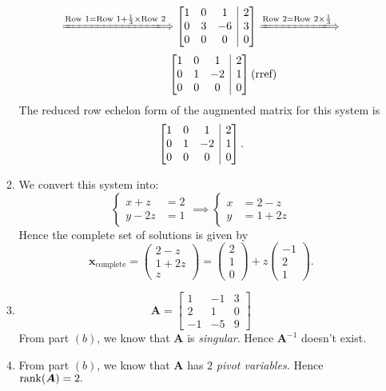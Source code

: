 \begin{enumerate}
\begin{enumerate}
\[\xLongrightarrow{\text{Row 1}=\text{Row 1}+\frac{1}{3}\x\text{Row 2}}
\left[\begin{array}{@{}ccc|c@{}}
1&0&1&2\\
0&3&-6&3\\
0&0&0&0
\end{array}\right]
\xLongrightarrow{\text{Row 2}=\text{Row 2}\x\frac{1}{3}}
\]
\[
\qquad\qquad\left[\begin{array}{@{}ccc|c@{}}
1&0&1&2\\
0&1&-2&1\\
0&0&0&0
\end{array}\right](\text{rref})
\]
The reduced row echelon form of the augmented matrix for this system is
\[
\left[\begin{array}{@{}ccc|c@{}}
1&0&1&2\\
0&1&-2&1\\
0&0&0&0
\end{array}\right].
\]
\item
We convert this system into:
\[
\left\{
\begin{aligned}
x+z&=2\\
y-2z&=1
\end{aligned}
\right.
\implies
\left\{
\begin{aligned}
x&=2-z\\
y&=1+2z
\end{aligned}
\right.
\]
Hence the complete set of solutions is given by
\[
\bm x_{\text{complete}}=\begin{pmatrix}
2-z\\1+2z\\z
\end{pmatrix}=\begin{pmatrix}
2\\1\\0
\end{pmatrix}+z\begin{pmatrix}
-1\\2\\1
\end{pmatrix}.
\]
\item
\[
\bm A=\begin{bmatrix}
1&-1&3\\2&1&0\\-1&-5&9
\end{bmatrix}
\]
From part $(b)$, we know that $\bm A$ is \textit{singular}. Hence $\bm A^{-1}$ doesn't exist.
\item
From part $(b)$, we know that $\bm A$ has $2$ \textit{pivot variables.} Hence $\operatorname{rank}(\bm A)=2.$

\end{enumerate}
\end{enumerate}
